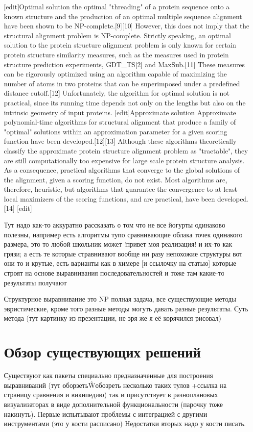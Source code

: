 \documentclass[a4paper, 12pt, titlepage, utf8]{extarticle}
\let\oldsection\section         %
\renewcommand{\section}{\newpage\oldsection}
\begin{document}
[edit]Optimal solution
the optimal "threading" of a protein sequence onto a known structure and the production of an optimal multiple sequence alignment have been shown to be NP-complete.[9][10] However, this does not imply that the structural alignment problem is NP-complete. Strictly speaking, an optimal solution to the protein structure alignment problem is only known for certain protein structure similarity measures, such as the measures used in protein structure prediction experiments, GDT_TS[2] and MaxSub.[11] These measures can be rigorously optimized using an algorithm capable of maximizing the number of atoms in two proteins that can be superimposed under a predefined distance cutoff.[12] Unfortunately, the algorithm for optimal solution is not practical, since its running time depends not only on the lengths but also on the intrinsic geometry of input proteins.
[edit]Approximate solution
Approximate polynomial-time algorithms for structural alignment that produce a family of "optimal" solutions within an approximation parameter for a given scoring function have been developed.[12][13] Although these algorithms theoretically classify the approximate protein structure alignment problem as "tractable", they are still computationally too expensive for large scale protein structure analysis. As a consequence, practical algorithms that converge to the global solutions of the alignment, given a scoring function, do not exist. Most algorithms are, therefore, heuristic, but algorithms that guarantee the convergence to at least local maximizers of the scoring functions, and are practical, have been developed.[14]
[edit]

Тут надо как-то аккуратно рассказать о том что не все йогурты одинаково полезны, например есть алгоритмы тупо сравнивающие облака точек одинакого размера, это то любой школьник может !привет моя реализация! и их-то как грязи; а есть те которые стравнивают вообще ни разу непохожие структуры вот они то и крутые, есть варианты как в химере [и ссылочку на статью] которые строят на основе выравнивания последовательностей и тоже там какие-то результаты получают

Структурное выравнивание это NP полная задача, все существующие методы эвристические, кроме того разные методы могуть давать разные результаты.
Суть метода (тут картинку из презентации, не зря же я её корячился рисовал)

\section{Обзор существующих решений}
Существуют как пакеты специально предназначенные для построения выравниваний (тут оборзеть\^Wобозреть несколько таких тулов +ссылка на страницу сравнения и википедию) так и присутствует в разноплановых визуализаторах в виде дополнительной функциональности (парочку тоже накинуть).
Первые испытывают проблемы с интеграцией с другими инструментами (это у кости расписано) 
Недостатки вторых надо у кости писать.
\end{document}
